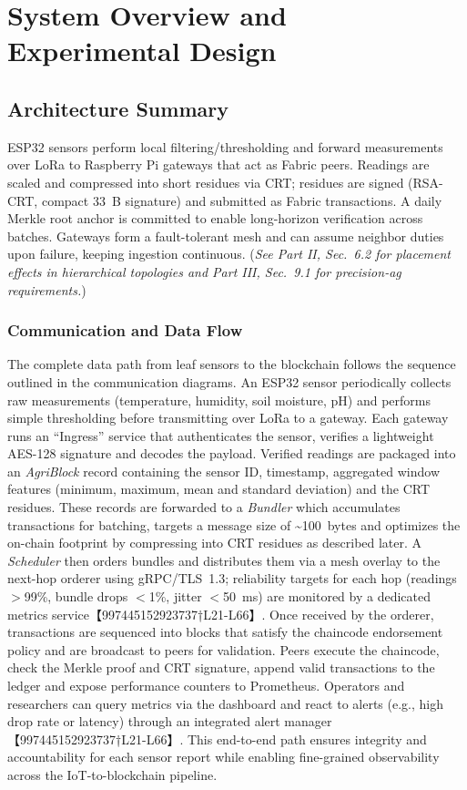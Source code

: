 \documentclass[12pt,onecolumn]{IEEEtran} %
\begin{document}
\section{System Overview and Experimental Design}

\subsection{Architecture Summary}
ESP32 sensors perform local filtering/thresholding and forward measurements over LoRa to Raspberry Pi gateways that act as Fabric peers. Readings are scaled and compressed into short residues via CRT; residues are signed (RSA-CRT, compact 33~B signature) and submitted as Fabric transactions. A daily Merkle root anchor is committed to enable long-horizon verification across batches. Gateways form a fault-tolerant mesh and can assume neighbor duties upon failure, keeping ingestion continuous. (\emph{See Part II, Sec.~6.2 for placement effects in hierarchical topologies and Part III, Sec.~9.1 for precision-ag requirements.}) %

\subsubsection{Communication and Data Flow}
The complete data path from leaf sensors to the blockchain follows the sequence outlined in the communication diagrams.  An ESP32 sensor periodically collects raw measurements (temperature, humidity, soil moisture, pH) and performs simple thresholding before transmitting over LoRa to a gateway.  Each gateway runs an ``Ingress'' service that authenticates the sensor, verifies a lightweight AES-128 signature and decodes the payload.  Verified readings are packaged into an \textit{AgriBlock} record containing the sensor ID, timestamp, aggregated window features (minimum, maximum, mean and standard deviation) and the CRT residues.  These records are forwarded to a \textit{Bundler} which accumulates transactions for batching, targets a message size of \textasciitilde{}100~bytes and optimizes the on-chain footprint by compressing into CRT residues as described later.  A \textit{Scheduler} then orders bundles and distributes them via a mesh overlay to the next-hop orderer using gRPC/TLS~1.3; reliability targets for 
each hop (readings $>$99\%, bundle drops $<$1\%, jitter $<$50~ms) are monitored by a dedicated metrics service【997445152923737†L21-L66】.  Once received by the orderer, transactions are sequenced into blocks that satisfy the chaincode endorsement policy and are broadcast to peers for validation.  Peers execute the chaincode, check the Merkle proof and CRT signature, append valid transactions to the ledger and expose performance counters to Prometheus.  Operators and researchers can query metrics via the dashboard and react to alerts (e.g., high drop rate or latency) through an integrated alert manager【997445152923737†L21-L66】.  This end-to-end path ensures integrity and accountability for each sensor report while enabling fine-grained observability across the IoT-to-blockchain pipeline.
\end{document}

